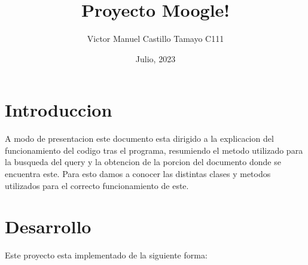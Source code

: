 \documentclass[a4paper, 12pt]{article}
\author{Victor Manuel Castillo Tamayo C111}
\title{Proyecto Moogle!}
\date{Julio, 2023}
\begin{document}
	\maketitle
	\section{Introduccion}\label{sec:intro}
		A modo de presentacion este documento esta dirigido a la explicacion del funcionamiento del codigo tras el programa, resumiendo el metodo utilizado para la busqueda del query y la obtencion de la porcion del documento donde se encuentra este. Para esto damos a conocer las distintas clases y metodos utilizados para el correcto funcionamiento de este.
	
	\section {Desarrollo}
		Este proyecto esta implementado de la siguiente forma:
\end{document}
